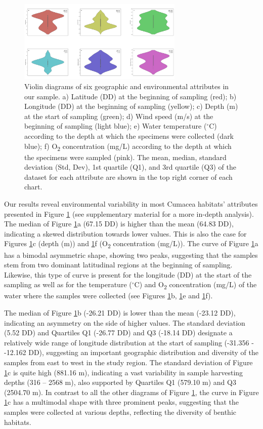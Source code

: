 \begin{figure}[htbp]
    \centering
    \includegraphics[width=0.7\textwidth]{figure1.jpg}
    \caption{Violin diagrams of six geographic and environmental attributes in our sample. a) Latitude (DD) at the beginning of sampling (red); b) Longitude (DD) at the beginning of sampling (yellow); c) Depth (m) at the start of sampling (green); d) Wind speed (m/s) at the beginning of sampling (light blue); e) Water temperature ($^\circ$C) according to the depth at which the specimens were collected (dark blue); f) O\textsubscript{2} concentration (mg/L) according to the depth at which the specimens were sampled (pink). The mean, median, standard deviation (Std, Dev), 1st quartile (Q1), and 3rd quartile (Q3) of the dataset for each attribute are shown in the top right corner of each chart. \label{fig:fig1}}
\end{figure}

Our results reveal environmental variability in most Cumacea habitats' attributes presented in Figure \ref{fig:fig1} (see supplementary material for a more in-depth analysis). The median of Figure \ref{fig:fig1}a (67.15 DD) is higher than the mean (64.83 DD), indicating a skewed distribution towards lower values. This is also the case for Figures \ref{fig:fig1}c (depth (m)) and \ref{fig:fig1}f (O\textsubscript{2} concentration (mg/L)). The curve of Figure  \ref{fig:fig1}a has a bimodal asymmetric shape, showing two peaks, suggesting that the samples stem from two dominant latitudinal regions at the beginning of sampling. Likewise, this type of curve is present for the longitude (DD) at the start of the sampling as well as for the temperature ($^\circ$C) and O\textsubscript{2} concentration (mg/L) of the water where the samples were collected (see Figures \ref{fig:fig1}b,  \ref{fig:fig1}e and  \ref{fig:fig1}f). 

The median of Figure \ref{fig:fig1}b (-26.21 DD) is lower than the mean (-23.12 DD), indicating an asymmetry on the side of higher values. The standard deviation (5.52 DD) and Quartiles Q1 (-26.77 DD) and Q3 (-18.14 DD) designate a relatively wide range of longitude distribution at the start of sampling (-31.356 - -12.162 DD), suggesting an important geographic distribution and diversity of the samples from east to west in the study region. The standard deviation of Figure \ref{fig:fig1}c is quite high (881.16 m), indicating a vast variability in sample harvesting depths (316 – 2568 m), also supported by Quartiles Q1 (579.10 m) and Q3 (2504.70 m). In contrast to all the other diagrams of Figure \ref{fig:fig1}, the curve in Figure \ref{fig:fig1}c has a multimodal shape with three prominent peaks, suggesting that the samples were collected at various depths, reflecting the diversity of benthic habitats. 

